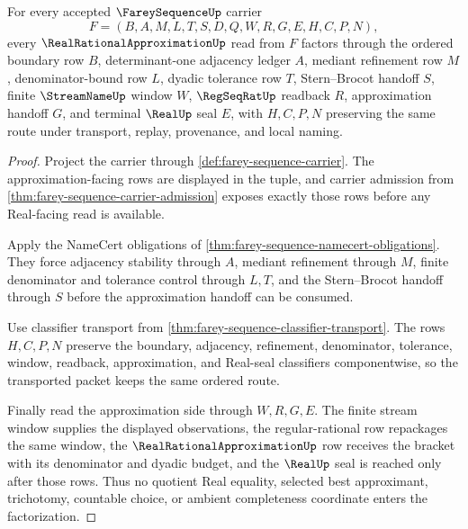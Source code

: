\begin{theorem}
\label{thm:farey-sequence-approximation-window-factorization}
For every accepted $\FareySequenceUp$ carrier
$$
F=(B,A,M,L,T,S,D,Q,W,R,G,E,H,C,P,N),
$$
every $\RealRationalApproximationUp$ read from $F$ factors through the ordered boundary row $B$, determinant-one adjacency ledger $A$, mediant refinement row $M$, denominator-bound row $L$, dyadic tolerance row $T$, Stern--Brocot handoff $S$, finite $\StreamNameUp$ window $W$, $\RegSeqRatUp$ readback $R$, approximation handoff $G$, and terminal $\RealUp$ seal $E$, with $H,C,P,N$ preserving the same route under transport, replay, provenance, and local naming.
\end{theorem}
\begin{proof}
Project the carrier through \autoref{def:farey-sequence-carrier}. The approximation-facing rows are displayed in the tuple, and carrier admission from \autoref{thm:farey-sequence-carrier-admission} exposes exactly those rows before any Real-facing read is available.

Apply the NameCert obligations of \autoref{thm:farey-sequence-namecert-obligations}. They force adjacency stability through $A$, mediant refinement through $M$, finite denominator and tolerance control through $L,T$, and the Stern--Brocot handoff through $S$ before the approximation handoff can be consumed.

Use classifier transport from \autoref{thm:farey-sequence-classifier-transport}. The rows $H,C,P,N$ preserve the boundary, adjacency, refinement, denominator, tolerance, window, readback, approximation, and Real-seal classifiers componentwise, so the transported packet keeps the same ordered route.

Finally read the approximation side through $W,R,G,E$. The finite stream window supplies the displayed observations, the regular-rational row repackages the same window, the $\RealRationalApproximationUp$ row receives the bracket with its denominator and dyadic budget, and the $\RealUp$ seal is reached only after those rows. Thus no quotient Real equality, selected best approximant, trichotomy, countable choice, or ambient completeness coordinate enters the factorization.
\end{proof}

